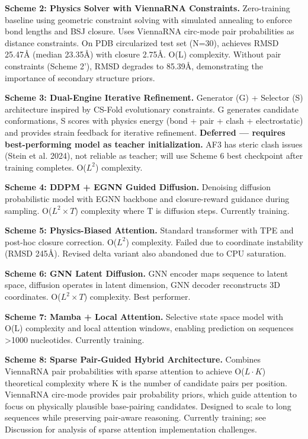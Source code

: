 \documentclass[12pt]{article}
\begin{document}
\textbf{Scheme 2: Physics Solver with ViennaRNA Constraints.} Zero-training baseline using geometric constraint solving with simulated annealing to enforce bond lengths and BSJ closure. Uses ViennaRNA circ-mode pair probabilities as distance constraints. On PDB circularized test set (N=30), achieves RMSD 25.47Å (median 23.35Å) with closure 2.75Å. O(L) complexity. Without pair constraints (Scheme 2'), RMSD degrades to 85.39Å, demonstrating the importance of secondary structure priors.

\textbf{Scheme 3: Dual-Engine Iterative Refinement.} Generator (G) + Selector (S) architecture inspired by CS-Fold evolutionary constraints. G generates candidate conformations, S scores with physics energy (bond + pair + clash + electrostatic) and provides strain feedback for iterative refinement. \textbf{Deferred — requires best-performing model as teacher initialization.} AF3 has steric clash issues (Stein et al. 2024), not reliable as teacher; will use Scheme 6 best checkpoint after training completes. O($L^2$) complexity.

\textbf{Scheme 4: DDPM + EGNN Guided Diffusion.} Denoising diffusion probabilistic model \citep{ho2020} with EGNN backbone and closure-reward guidance during sampling. O($L^2 \times T$) complexity where T is diffusion steps. Currently training.

\textbf{Scheme 5: Physics-Biased Attention.} Standard transformer with TPE and post-hoc closure correction. O($L^2$) complexity. Failed due to coordinate instability (RMSD 245\AA). Revised delta variant also abandoned due to CPU saturation.

\textbf{Scheme 6: GNN Latent Diffusion.} GNN encoder maps sequence to latent space, diffusion operates in latent dimension, GNN decoder reconstructs 3D coordinates. O($L^2 \times T$) complexity. Best performer.

\textbf{Scheme 7: Mamba + Local Attention.} Selective state space model \citep{gu2023} with O(L) complexity and local attention windows, enabling prediction on sequences >1000 nucleotides. Currently training.

\textbf{Scheme 8: Sparse Pair-Guided Hybrid Architecture.} Combines ViennaRNA pair probabilities with sparse attention to achieve O($L \cdot K$) theoretical complexity where K is the number of candidate pairs per position. ViennaRNA circ-mode provides pair probability priors, which guide attention to focus on physically plausible base-pairing candidates. Designed to scale to long sequences while preserving pair-aware reasoning. Currently training; see Discussion for analysis of sparse attention implementation challenges.
\end{document}
